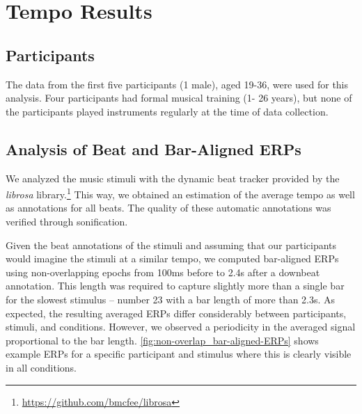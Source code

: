\section*{Tempo Results}
\subsection*{Participants}
The data from the first five participants (1 male), aged 19-36, were used for this analysis. Four participants had formal musical training (1- 26 years), but none of the participants played instruments regularly at the time of data collection.

\subsection*{Analysis of Beat and Bar-Aligned ERPs}

We analyzed the music stimuli with the dynamic beat tracker \cite{Ellis2007beat} provided by the \emph{librosa} library.\footnote{%
\url{https://github.com/bmcfee/librosa}}
This way, we obtained an estimation of the average tempo as well as annotations for all beats. %
The quality of these automatic annotations was verified through sonification.

Given the beat annotations of the stimuli and assuming that our participants would imagine the stimuli at a similar tempo, 
we computed bar-aligned ERPs using non-overlapping epochs from 100ms before to 2.4s after a downbeat annotation.
This length was required to capture slightly more than a single bar for the slowest stimulus -- number 23 with a bar length of more than 2.3s.
As expected, the resulting averaged ERPs differ considerably between participants, stimuli, and conditions.
However, we observed a periodicity in the averaged signal proportional to the bar length.
%
\autoref{fig:non-overlap_bar-aligned-ERPs} shows example ERPs 
for a specific participant and stimulus where this is clearly visible in all conditions.

